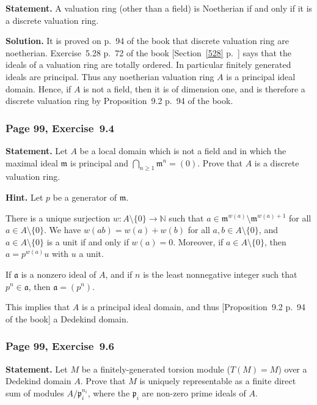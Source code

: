 \documentclass[12pt,letterpaper]{article}%
\newcommand{\mf}{\mathfrak}
\newcommand{\aaa}{\mf a}
\newcommand{\mmm}{\mf m}
\newcommand{\ppp}{\mf p}
\newcommand{\nn}{\noindent}
\begin{document}
\textbf{Statement.} A valuation ring (other than a field) is Noetherian if and only if it is a discrete valuation ring.

\nn\textbf{Solution.} It is proved on p.~94 of the book that discrete valuation ring are noetherian. Exercise~5.28 p.~72 of the book [Section~\ref{528} p.~\pageref{528}] says that the ideals of a valuation ring are totally ordered. In particular finitely generated ideals are principal. Thus any noetherian valuation ring $A$ is a principal ideal domain. Hence, if $A$ is not a field, then it is of dimension one, and is therefore a discrete valuation ring by Proposition~9.2 p.~94 of the book.

\subsubsection{Page 99, Exercise~9.4}%

\textbf{Statement.} Let $A$ be a local domain which is not a field and in which the maximal ideal $\mmm$ is principal and $\bigcap_{n\ge1}\mmm^n=(0)$. Prove that $A$ is a discrete valuation ring.

\nn\textbf{Hint.} Let $p$ be a generator of $\mmm$. 

There is a unique surjection $w:A\setminus\{0\}\to\mathbb N$ such that $a\in\mmm^{w(a)}\setminus\mmm^{w(a)+1}$ for all $a\in A\setminus\{0\}$. We have $w(ab)=w(a)+w(b)$ for all $a,b\in A\setminus\{0\}$, and $a\in A\setminus\{0\}$ is a unit if and only if $w(a)=0$. Moreover, if $a\in A\setminus\{0\}$, then $a=p^{w(a)}u$ with $u$ a unit.

If $\aaa$ is a nonzero ideal of $A$, and if $n$ is the least nonnegative integer such that $p^n\in\aaa$, then $\aaa=(p^n)$. 

This implies that $A$ is a principal ideal domain, and thus [Proposition~9.2 p.~94 of the book] a Dedekind domain.

\subsubsection{Page 99, Exercise~9.6}%

\textbf{Statement.} Let $M$ be a finitely-generated torsion module ($T(M)=M$) over a Dedekind domain $A$. Prove that $M$ is uniquely representable as a finite direct sum of modules $A/\ppp_i^{n_i}$, where the $\ppp_i$ are non-zero prime ideals of $A$.
\end{document}
